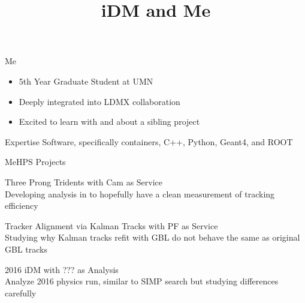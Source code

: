 \documentclass[aspectratio=169]{beamer}
\title[HPS Analysis Workshop]{iDM and Me}
\begin{document}
\begin{frame}
  \maketitle
\end{frame}

\begin{frame}{Me}
  \begin{itemize}
    \item 5th Year Graduate Student at UMN
    \item Deeply integrated into LDMX collaboration
    \item Excited to learn with and about a sibling project
  \end{itemize}
  \vfill
  \begin{block}{Expertise}
    {\color{UMNMaroon}Software}, specifically containers, C++, Python, Geant4, and ROOT
  \end{block}
\end{frame}

\begin{frame}{Me}{HPS Projects}
  \begin{block}{Three Prong Tridents}
    with {\color{UMNMaroon}Cam} as {\color{UMNGold}Service} \\
    Developing analysis in  to hopefully have a clean measurement of tracking efficiency
  \end{block}
  \begin{block}{Tracker Alignment via Kalman Tracks}
    with {\color{UMNMaroon}PF} as {\color{UMNGold}Service} \\
    Studying why Kalman tracks refit with GBL do not behave the same as original GBL tracks
  \end{block}
  \begin{block}{2016 iDM}
    with {\color{UMNMaroon}???} as {\color{UMNGold}Analysis} \\
    Analyze 2016 physics run, similar to SIMP search but studying differences carefully
  \end{block}
\end{frame}

\end{document}
